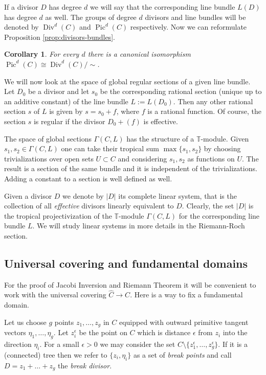\documentclass[12pt]{amsart}
\theoremstyle{plain}
\newtheorem{corollary}[theorem]{Corollary}
\theoremstyle{definition}
\theoremstyle{remark}
\newcommand{\<}{\langle}   %
\renewcommand{\>}{\rangle} %
\newcommand{\Pic}{\operatorname{Pic}}
\newcommand{\Div}{\operatorname{Div}}
\newcommand{\Rtr}{\mathbb T}
\begin{document}
If a divisor $D$ has degree $d$ we will say that the corresponding line bundle $L(D)$
has degree $d$ as well. The groups of degree $d$ divisors and line bundles will
be denoted by $\Div^d(C)$ and $\Pic^d(C)$ respectively. Now we can reformulate
Proposition \ref{prop:divisors-bundles}.
\begin{corollary}
For every $d$ there is a canonical isomorphism $\Pic^d(C)\cong \Div^d(C)/\sim$.
\end{corollary}


We will now look at the space of global regular
sections of a given line bundle. Let $D_0$ be a divisor and let $s_0$ be the
corresponding rational section (unique up to an additive constant) of the
line bundle $L:=L(D_0)$. Then any other rational section $s$ of $L$ is given
by $s=s_0+f$, where $f$ is a rational function. Of course, the section $s$ is
regular if the divisor $D_0+(f)$ is effective.

The space of global sections $\Gamma(C,L)$ has the structure of a
$\Rtr$-module. Given $s_1,s_2\in \Gamma(C,L)$ one can take their tropical sum
$\max\{s_1,s_2\}$ by choosing trivializations over open sets $U\subset C$ and
considering $s_1,s_2$ as functions on $U$. The result is a section of the same
bundle and it is independent of the trivializations. Adding a constant to a
section is well defined as well.

Given a divisor $D$ we denote by $|D|$ its complete linear system, that is the collection of all {\em effective} divisors linearly equivalent to $D$. Clearly, the set $|D|$ is the tropical projectivization of the $\Rtr$-module $\Gamma(C,L)$ for the corresponding line bundle $L$. We will study linear systems in more details in the Riemann-Roch section.


\subsection{Universal covering and fundamental domains}\label{break_points}
For the proof of Jacobi Inversion and Riemann Theorem it will be convenient to work with
the universal covering $\hat C\to C$. Here is a way to fix a fundamental domain.

Let us choose $g$ points $z_1,\dots,z_g$ in $C$  equipped with outward primitive tangent vectors $\eta_1,\dots,\eta_g$.
Let $z_i^\epsilon$ be the point on $C$ which is distance $\epsilon$ from $z_i$ into the direction $\eta_i$.
For a small $\epsilon>0$ we may consider the set
$C\setminus\{z_1^\epsilon,\dots,z_g^\epsilon\}$. If it is a (connected) tree
then we refer to $\{z_i,\eta_i\}$ as a set of {\em break points} and
call $D=z_1+\dots+z_g$ the {\em break divisor}.
\end{document}
